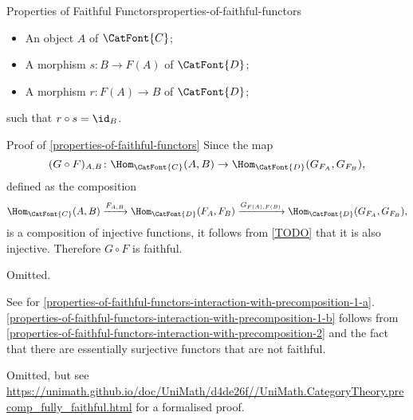 \begin{proposition}{Properties of Faithful Functors}{properties-of-faithful-functors}
\begin{enumerate}
\begin{enumerate}
\begin{itemize}
                            \begin{itemize}
                                \item An object $A$ of $\CatFont{C}$;
                                \item A morphism $s\colon B\to F(A)$ of $\CatFont{D}$;
                                \item A morphism $r\colon F(A)\to B$ of $\CatFont{D}$;
                            \end{itemize}
                            such that $r\circ s=\id_{B}$.
                    \end{itemize}
            \end{enumerate}
    \end{enumerate}
\end{proposition}
\begin{Proof}{Proof of \cref{properties-of-faithful-functors}}%
    Since the map
    \[
        (G\circ F)_{A,B}
        \colon
        \Hom_{\CatFont{C}}(A,B)
        \to
        \Hom_{\CatFont{D}}(G_{F_{A}},G_{F_{B}}),%
    \]%
    defined as the composition
    \[
        \Hom_{\CatFont{C}}(A,B)%
        \xrightarrow{F_{A,B}}%
        \Hom_{\CatFont{D}}(F_{A},F_{B})%
        \xrightarrow{G_{F(A),F(B)}}%
        \Hom_{\CatFont{D}}(G_{F_{A}},G_{F_{B}}),%
    \]%
    is a composition of injective functions, it follows from \cref{TODO} that it is also injective. Therefore $G\circ F$ is faithful.

    Omitted.

    See \cite{MSE733163} for \cref{properties-of-faithful-functors-interaction-with-precomposition-1-a}. \cref{properties-of-faithful-functors-interaction-with-precomposition-1-b} follows from \cref{properties-of-faithful-functors-interaction-with-precomposition-2} and the fact that there are essentially surjective functors that are not faithful.

    Omitted, but see \url{https://unimath.github.io/doc/UniMath/d4de26f//UniMath.CategoryTheory.precomp\_fully\_faithful.html} for a formalised proof.


\end{Proof}
